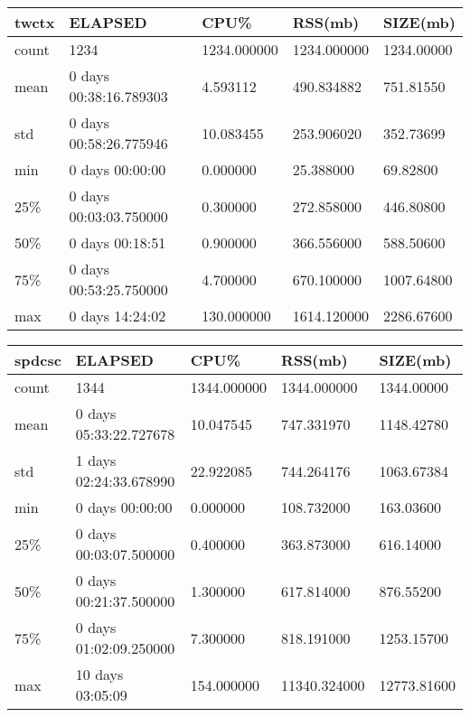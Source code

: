 \documentclass{article}
\begin{document}
\begin{tabular}{|l|l|l|l|l|}
\hline 
\hline twctx& ELAPSED&  CPU\%&  RSS(mb)&  SIZE(mb) \\
\hline count&   1234& 1234.000000& 1234.000000& 1234.00000 \\
\hline mean&  0 days 00:38:16.789303&   4.593112&  490.834882&  751.81550 \\
\hline std&  0 days 00:58:26.775946&  10.083455&  253.906020&  352.73699 \\
\hline min&   0 days 00:00:00&   0.000000&  25.388000&  69.82800 \\
\hline 25\%&  0 days 00:03:03.750000&   0.300000&  272.858000&  446.80800 \\
\hline 50\%&   0 days 00:18:51&   0.900000&  366.556000&  588.50600 \\
\hline 75\%&  0 days 00:53:25.750000&   4.700000&  670.100000& 1007.64800 \\
\hline max&   0 days 14:24:02&  130.000000& 1614.120000& 2286.67600 \\
\hline 
\end{tabular}


\begin{tabular}{|l|l|l|l|l|}
\hline 
\hline spdcsc& ELAPSED&    CPU\%&   RSS(mb)&  SIZE(mb) \\
\hline count&   1344& 1344.000000&  1344.000000&  1344.00000 \\
\hline mean&  0 days 05:33:22.727678&  10.047545&  747.331970&  1148.42780 \\
\hline std&  1 days 02:24:33.678990&  22.922085&  744.264176&  1063.67384 \\
\hline min&   0 days 00:00:00&   0.000000&  108.732000&  163.03600 \\
\hline 25\%&  0 days 00:03:07.500000&   0.400000&  363.873000&  616.14000 \\
\hline 50\%&  0 days 00:21:37.500000&   1.300000&  617.814000&  876.55200 \\
\hline 75\%&  0 days 01:02:09.250000&   7.300000&  818.191000&  1253.15700 \\
\hline max&  10 days 03:05:09&  154.000000& 11340.324000& 12773.81600 \\
\hline 
\end{tabular}
 
\end{document}
